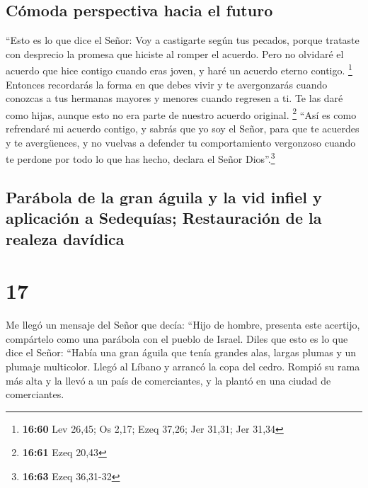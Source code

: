 \hypertarget{cuxf3moda-perspectiva-hacia-el-futuro}{%
\subsection{Cómoda perspectiva hacia el
futuro}\label{cuxf3moda-perspectiva-hacia-el-futuro}}

 ``Esto es lo que dice el Señor: Voy a castigarte según
tus pecados, porque trataste con desprecio la promesa que hiciste al
romper el acuerdo.  Pero no olvidaré el acuerdo que hice
contigo cuando eras joven, y haré un acuerdo eterno contigo. \footnote{\textbf{16:60}
  Lev 26,45; Os 2,17; Ezeq 37,26; Jer 31,31; Jer 31,34} 
Entonces recordarás la forma en que debes vivir y te avergonzarás cuando
conozcas a tus hermanas mayores y menores cuando regresen a ti. Te las
daré como hijas, aunque esto no era parte de nuestro acuerdo original.
\footnote{\textbf{16:61} Ezeq 20,43}  ``Así es como
refrendaré mi acuerdo contigo, y sabrás que yo soy el Señor,
 para que te acuerdes y te avergüences, y no vuelvas a
defender tu comportamiento vergonzoso cuando te perdone por todo lo que
has hecho, declara el Señor Dios''.\footnote{\textbf{16:63} Ezeq
  36,31-32}

\hypertarget{paruxe1bola-de-la-gran-uxe1guila-y-la-vid-infiel-y-aplicaciuxf3n-a-sedequuxedas-restauraciuxf3n-de-la-realeza-davuxeddica}{%
\subsection{Parábola de la gran águila y la vid infiel y aplicación a
Sedequías; Restauración de la realeza
davídica}\label{paruxe1bola-de-la-gran-uxe1guila-y-la-vid-infiel-y-aplicaciuxf3n-a-sedequuxedas-restauraciuxf3n-de-la-realeza-davuxeddica}}

\hypertarget{section-16}{%
\section{17}\label{section-16}}

 Me llegó un mensaje del Señor que decía: 
``Hijo de hombre, presenta este acertijo, compártelo como una parábola
con el pueblo de Israel.  Diles que esto es lo que dice el
Señor: ``Había una gran águila que tenía grandes alas, largas plumas y
un plumaje multicolor. Llegó al Líbano y arrancó la copa del cedro.
 Rompió su rama más alta y la llevó a un país de
comerciantes, y la plantó en una ciudad de comerciantes.

